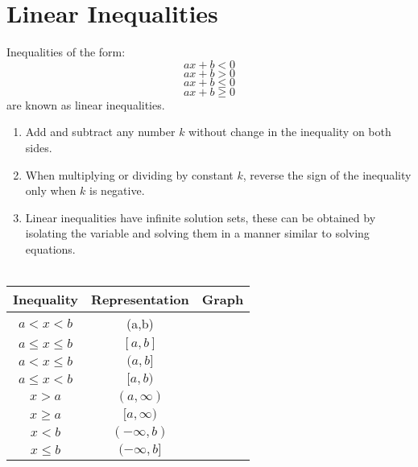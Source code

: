 \section{Linear Inequalities}

\setlength{\baselineskip}{1pt}
Inequalities of the form: %
\vspace{\baselineskip}
\[ax + b < 0\] %
\vspace{\baselineskip}
 \[ax + b > 0\] %
\vspace{\baselineskip} 
\[ax + b \leq 0\] %
\vspace{\baselineskip} 
\[ax + b \geq 0\] %
\vspace{\baselineskip} 
are known as linear inequalities.
\vspace{\baselineskip}
 
\begin{enumerate}
\item Add and subtract any number $k$ without change in the inequality on both sides.
\item When multiplying or dividing by constant $k$, reverse the sign of the inequality only when $k$ is negative.
\item Linear inequalities have infinite solution sets, these can be obtained by isolating the variable and solving them in a manner similar to solving equations.\\ \\
\end{enumerate}

\begin{center}
\begin{tabular}{|c|c|>{\centering\arraybackslash}p{}|}
\hline 
Inequality & Representation & Graph \\ 
\hline 
$ a < x < b$ & (a,b) &  \\ 
\hline 
$ a \leq x \leq b $ & $ [a,b] $ &  \\ 
\hline 
$ a < x \leq b $ & $ (a,b] $ &  \\ 
\hline 
$ a \leq x < b $ & $ [a,b) $ &  \\ 
\hline 
$ x > a $ & $ (a,\infty) $ &  \\ 
\hline 
$ x \geq a $ & $ [a,\infty) $ &  \\ 
\hline 
$ x < b $ & $ (-\infty,b) $ &  \\ 
\hline 
$ x \leq b $ & $ (-\infty,b] $ &  \\ 
\hline 
\end{tabular} 
\end{center}